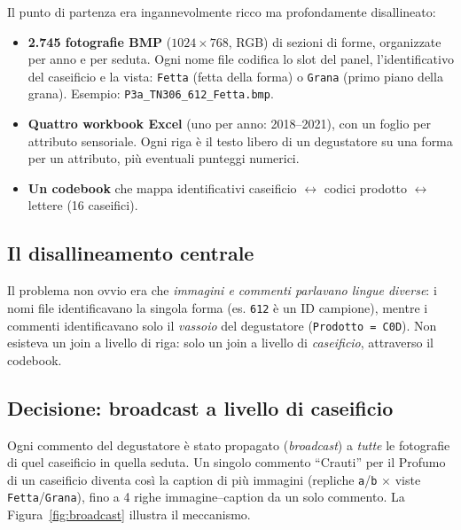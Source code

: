 \documentclass[11pt,a4paper]{article}
\begin{document}
Il punto di partenza era ingannevolmente ricco ma profondamente disallineato:
\begin{itemize}
\item \textbf{2.745 fotografie BMP} ($1024\times768$, RGB) di sezioni di forme,
organizzate per anno e per seduta. Ogni nome file codifica lo slot del panel,
l'identificativo del caseificio e la vista: \texttt{Fetta} (fetta della forma)
o \texttt{Grana} (primo piano della grana). Esempio:
\texttt{P3a\_TN306\_612\_Fetta.bmp}.
\item \textbf{Quattro workbook Excel} (uno per anno: 2018--2021), con un foglio
per attributo sensoriale. Ogni riga \`e il testo libero di un degustatore su
una forma per un attributo, pi\`u eventuali punteggi numerici.
\item \textbf{Un codebook} che mappa identificativi caseificio
$\leftrightarrow$ codici prodotto $\leftrightarrow$ lettere (16 caseifici).
\end{itemize}

\subsection{Il disallineamento centrale}
Il problema non ovvio era che \emph{immagini e commenti parlavano lingue
diverse}: i nomi file identificavano la singola forma (es. \texttt{612} \`e un
ID campione), mentre i commenti identificavano solo il \emph{vassoio} del
degustatore (\texttt{Prodotto = C0D}). Non esisteva un join a livello di riga:
solo un join a livello di \emph{caseificio}, attraverso il codebook.

\subsection{Decisione: broadcast a livello di caseificio}
Ogni commento del degustatore \`e stato propagato (\emph{broadcast}) a
\emph{tutte} le fotografie di quel caseificio in quella seduta. Un singolo
commento ``Crauti'' per il Profumo di un caseificio diventa cos\`i la caption
di pi\`u immagini (repliche \texttt{a}/\texttt{b} $\times$ viste
\texttt{Fetta}/\texttt{Grana}), fino a 4 righe immagine--caption da un solo
commento. La Figura~\ref{fig:broadcast} illustra il meccanismo.
\end{document}
